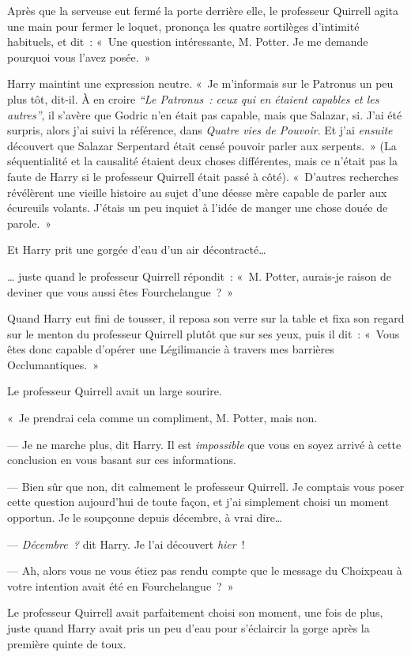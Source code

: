 Après que la serveuse eut fermé la porte derrière elle, le professeur Quirrell agita une main pour fermer le loquet, prononça les quatre sortilèges d'intimité habituels, et dit~: «~Une question intéressante, M. Potter.
Je me demande pourquoi vous l'avez posée.~»

Harry maintint une expression neutre.
«~Je m'informais sur le Patronus un peu plus tôt, dit-il.
À en croire \emph{“Le Patronus~: ceux qui en étaient capables et les autres”}, il s'avère que Godric n'en était pas capable, mais que Salazar, si.
J'ai été surpris, alors j'ai suivi la référence, dans \emph{Quatre vies de Pouvoir}.
Et j'ai \emph{ensuite} découvert que Salazar Serpentard était censé pouvoir parler aux serpents.~»
(La séquentialité et la causalité étaient deux choses différentes, mais ce n'était pas la faute de Harry si le professeur Quirrell était passé à côté).
«~D'autres recherches révélèrent une vieille histoire au sujet d'une déesse mère capable de parler aux écureuils volants.
J'étais un peu inquiet à l'idée de manger une chose douée de parole.~»

Et Harry prit une gorgée d'eau d'un air décontracté…

… juste quand le professeur Quirrell répondit~: «~M. Potter, aurais-je raison de deviner que vous aussi êtes Fourchelangue~?~»

Quand Harry eut fini de tousser, il reposa son verre sur la table et fixa son regard sur le menton du professeur Quirrell plutôt que sur ses yeux, puis il dit~: «~Vous êtes donc capable d'opérer une Légilimancie à travers mes barrières Occlumantiques.~»

Le professeur Quirrell avait un large sourire.

«~Je prendrai cela comme un compliment, M. Potter, mais non.

--- Je ne marche plus, dit Harry.
Il est \emph{impossible} que vous en soyez arrivé à cette conclusion en vous basant sur ces informations.

--- Bien sûr que non, dit calmement le professeur Quirrell.
Je comptais vous poser cette question aujourd'hui de toute façon, et j'ai simplement choisi un moment opportun.
Je le soupçonne depuis décembre, à vrai dire…

--- \emph{Décembre~?} dit Harry.
Je l'ai découvert \emph{hier}~!

--- Ah, alors vous ne vous étiez pas rendu compte que le message du Choixpeau à votre intention avait été en Fourchelangue~?~»

Le professeur Quirrell avait parfaitement choisi son moment, une fois de plus, juste quand Harry avait pris un peu d'eau pour s'éclaircir la gorge après la première quinte de toux.

